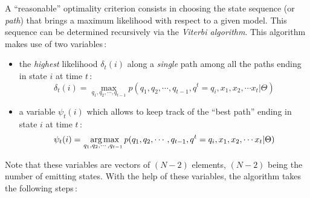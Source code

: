 \documentclass[twoside,a4paper,titlepage]{article}
\begin{document}
A ``reasonable'' optimality criterion consists in choosing the state
sequence (or {\em path}) that brings a maximum likelihood with respect to a
given model.  This sequence can be determined recursively via the {\em
Viterbi algorithm}. This algorithm makes use of two variables\,:
\begin{itemize}
\item the {\em highest} likelihood $\delta_t(i)$ along a {\em single} path
among all the paths ending in state $i$ at time $t$\,:
\[
\delta_t(i) = \max_{q_1,q_2,\cdots,q_{t-1}}
p(q_1,q_2,\cdots,q_{t-1},q^t=q_i,x_1,x_2,\cdots x_t|\Theta)
\]
\item a variable $\psi_t(i)$ which allows to keep track of the ``best
path'' ending in state $i$ at time $t$\,:
\[
\psi_t(i) = \mbox{\hspace{2ex}arg}\hspace{-1ex}\max_{\hspace{-4.5ex}q_1,q_2,\cdots,q_{t-1}}
p(q_1,q_2,\cdots,q_{t-1},q^t=q_i,x_1,x_2,\cdots x_t|\Theta)
\]
\end{itemize}
Note that these variables are vectors of $(N-2)$ elements, $(N-2)$ being
the number of emitting states. With the help of these variables, the
algorithm takes the following steps\,: \\[1em]
\noindent {}
\end{document}
